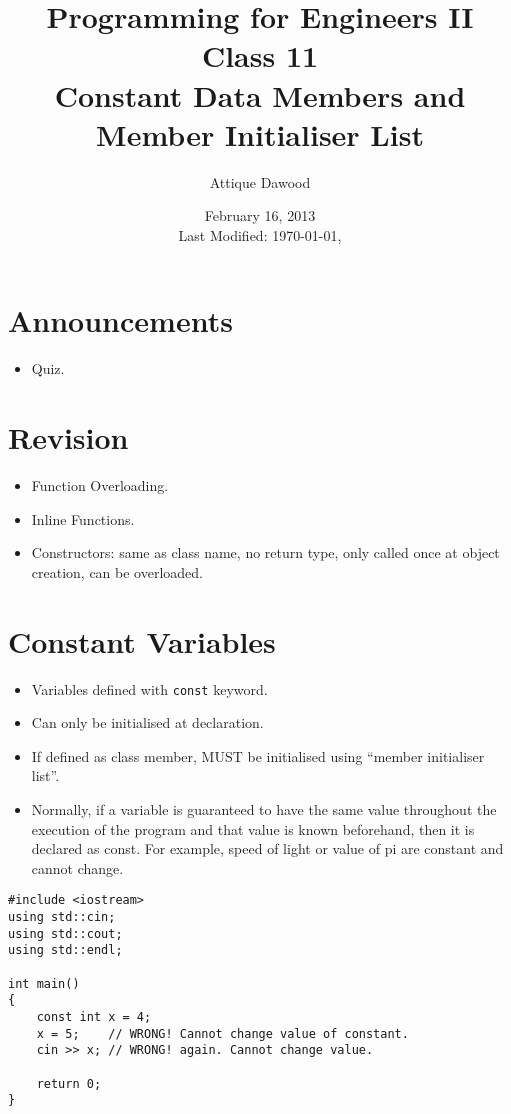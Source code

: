 \documentclass[12pt,a4paper]{article}
\title{\vspace{-2cm}Programming for Engineers II\\Class 11\\Constant Data Members and Member Initialiser List}
\author{Attique Dawood}
\date{February 16, 2013\\[0.2cm] Last Modified: \today, \currenttime}
\begin{document}
\maketitle
\section{Announcements}
\begin{itemize}
\item Quiz.
\end{itemize}
\section{Revision}
\begin{itemize}
\item Function Overloading.
\item Inline Functions.
\item Constructors: same as class name, no return type, only called once at object creation, can be overloaded.
\end{itemize}
\section{Constant Variables}
\begin{itemize}
\item Variables defined with \verb|const| keyword.
\item Can only be initialised at declaration.
\item If defined as class member, MUST be initialised using ``member initialiser list''.
\item Normally, if a variable is guaranteed to have the same value throughout the execution of the program and that value is known beforehand, then it is declared as const. For example, speed of light or value of pi are constant and cannot change.
\end{itemize}
\begin{lstlisting}[caption={const variable}]
#include <iostream>
using std::cin;
using std::cout;
using std::endl;

int main()
{
	const int x = 4;
	x = 5;    // WRONG! Cannot change value of constant.
	cin >> x; // WRONG! again. Cannot change value.
	
	return 0;
}
\end{lstlisting}
\end{document}
